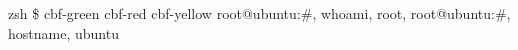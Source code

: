 \documentclass[12pt, a4paper]{article}
\begin{document}
\begin{terminal}
    {zsh}
    {\$}
    {cbf-green}
    {cbf-red}
    {cbf-yellow}
    {root@ubuntu:\#,
    whoami,
    root,
    root@ubuntu:\#,
    hostname,
    ubuntu}
\end{terminal}
\end{document}
